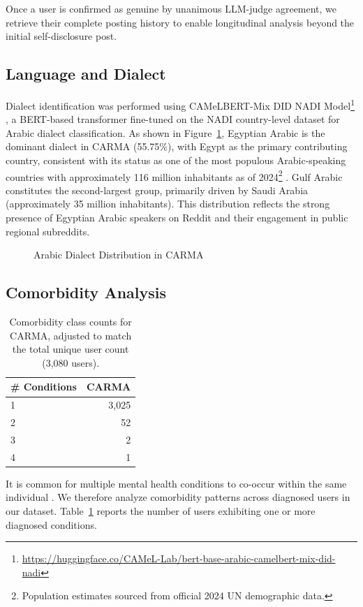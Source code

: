 \documentclass[11pt]{article}
\begin{document}
Once a user is confirmed as genuine by unanimous LLM-judge agreement, we retrieve their complete posting history to enable longitudinal analysis beyond the initial self-disclosure post.


\subsection{Language and Dialect}
Dialect identification was performed using CAMeLBERT-Mix DID NADI Model\footnote{\url{https://huggingface.co/CAMeL-Lab/bert-base-arabic-camelbert-mix-did-nadi}} \cite{inoue-etal-2021-interplay}, a BERT-based transformer fine-tuned on the NADI country-level dataset for Arabic dialect classification. As shown in Figure~\ref{fig:dialect_dist},
Egyptian Arabic is the dominant dialect in CARMA (55.75\%), with Egypt as the primary contributing country, consistent with its status as one of the most populous Arabic-speaking countries with approximately 116 million inhabitants as of 2024\footnote{Population estimates sourced from official 2024 UN demographic data.} \citep{un2024wpp_data}. Gulf Arabic constitutes the second-largest group, primarily driven by Saudi Arabia (approximately 35 million inhabitants). This distribution reflects the strong presence of Egyptian Arabic speakers on Reddit and their engagement in public regional subreddits.


\begin{figure}[h]
    \centering
    \caption{Arabic Dialect Distribution in CARMA}
    \label{fig:dialect_dist}
\end{figure}

\subsection{Comorbidity Analysis}
\label{subsec:comorbidity}

\begin{table}[t]
\centering
\begin{tabular}{lr}
\toprule
\textbf{\# Conditions} & \textbf{CARMA} \\
\midrule
1 & 3,025 \\
2 &    52 \\
3 &     2 \\
4 &     1 \\
\bottomrule
\end{tabular}
\caption{Comorbidity class counts for CARMA, adjusted to match the total unique user count (3,080 users).}
\label{tab:comorbidity_counts}
\end{table}
It is common for multiple mental health conditions to co-occur within the same individual \cite{cohan-etal-2018-smhd}. We therefore analyze comorbidity patterns across diagnosed users in our dataset. Table~\ref{tab:comorbidity_counts} reports the number of users exhibiting one or more diagnosed conditions.
\end{document}
